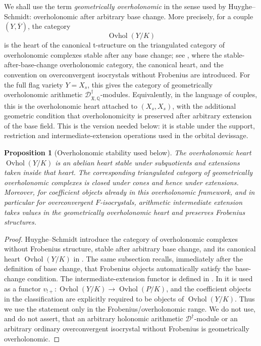 \documentclass[11pt]{amsart}
\theoremstyle{plain}
\newtheorem{proposition}{Proposition}[section]
\theoremstyle{definition}
\theoremstyle{remark}
\newcommand{\Ovhol}{\operatorname{Ovhol}}
\begin{document}
We shall use the term \emph{geometrically overholonomic} in the sense used by
Huyghe--Schmidt: overholonomic after arbitrary base change. More precisely, for
a couple \((Y,\overline Y)\), the category
\[
  \Ovhol(Y/K)
\]
is the heart of the canonical t-structure on the triangulated category of
overholonomic complexes stable after any base change; see \cite[\S2.1, first paragraphs and Definition 2.1.3]{HuygheSchmidtIntermediate},
where the stable-after-base-change overholonomic category, the canonical
heart, and the convention on overconvergent isocrystals without Frobenius are
introduced. For the full flag variety
\(Y=X_s\), this gives the category of geometrically overholonomic arithmetic
\(\mathscr D^\dagger_{\mathfrak X,\mathbb Q}\)-modules.  Equivalently, in the
language of couples, this is the overholonomic heart attached to
\((X_s,X_s)\), with the additional geometric condition that overholonomicity is
preserved after arbitrary extension of the base field.  This is the version
needed below: it is stable under the support, restriction and
intermediate-extension operations used in the orbital devissage.

\begin{proposition}[Overholonomic stability used below]
\label{prop:ovhol-stability}
The overholonomic heart \(\Ovhol(Y/K)\) is an abelian heart stable under
subquotients and extensions taken inside that heart.  The corresponding
triangulated category of geometrically overholonomic complexes is closed under
cones and hence under extensions.  Moreover, for coefficient objects already in
this overholonomic framework, and in particular for overconvergent
\(F\)-isocrystals, arithmetic intermediate extension takes values in the
geometrically overholonomic heart and preserves Frobenius structures.
\end{proposition}

\begin{proof}
Huyghe--Schmidt introduce the category of overholonomic complexes without
Frobenius structure, stable after arbitrary base change, and its canonical
heart \(\Ovhol(Y/K)\) in \cite[\S2.1, first paragraphs]{HuygheSchmidtIntermediate}.  The same
subsection recalls, immediately after the definition of base change, that
Frobenius objects automatically satisfy the base-change condition.  The
intermediate-extension functor is defined in
\cite[\S2.2, definition of \(u_{!+}\)]{HuygheSchmidtIntermediate}.  In
\cite[\S2.3, before Proposition~2.3.3]{HuygheSchmidtIntermediate} it is used as
a functor \(v_{!+}:\Ovhol(Y/K)\to\Ovhol(P/K)\), and the coefficient objects in
the classification are explicitly required to be objects of \(\Ovhol(Y/K)\).  Thus
we use the statement only in the Frobenius/overholonomic range.  We do not use,
and do not assert, that an arbitrary holonomic arithmetic \(\mathscr D^\dagger\)-module
or an arbitrary ordinary overconvergent isocrystal without Frobenius is
geometrically overholonomic.
\end{proof}
\end{document}
